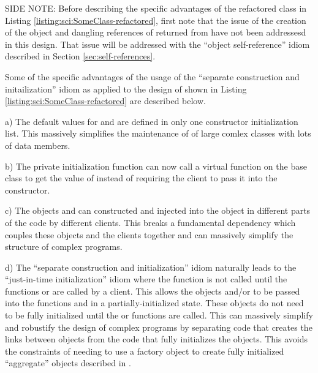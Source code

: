 \documentclass[pdf,ps2pdf,11pt]{SANDreport}
\begin{document}
SIDE NOTE: Before describing the specific advantages of the refactored class
in Listing {}\ref{listing:sci:SomeClass-refactored}, first note that the issue
of the creation of the {} object and dangling references of {}
returned from {} have not been addressesd in this design.  That
issue will be addressed with the ``object self-reference'' idiom described in
Section {}\ref{sec:self-references}.

Some of the specific advantages of the usage of the ``separate construction
and initailization'' idiom as applied to the design of {} shown
in Listing {}\ref{listing:sci:SomeClass-refactored} are described below.

a) The default values for {} and
{} are defined in only one constructor
initialization list.  This massively simplifies the maintenance of of
large comlex classes with lots of data members.

b) The private initialization function
{} can now call a virtual function on
the base class {} to get the
value of {} instead of requiring the client to pass
it into the constructor.

c) The objects {} and {} can constructed and
injected into the {} object in different parts of
the code by different clients.  This breaks a fundamental dependency
which couples these objects and the clients together and can massively
simplify the structure of complex programs.

d) The ``separate construction and initialization'' idiom naturally leads to
the ``just-in-time initialization'' idiom where the
{} function is not called until the functions
{} or {} are called by a client.  This
allows the objects {} and/or {} to be passed into the functions
{}  and {} in a partially-initialized state.
These objects do not need to be fully initialized until the
{} or {} functions are called.  This
can massively simplify and robustify the design of complex programs by
separating code that creates the links between objects from the code that
fully initializes the objects.  This avoids the constraints of needing to use
a factory object to create fully initialized ``aggregate'' objects described
in {}\cite{DomainDrivenDesign}.
\end{document}
